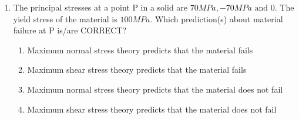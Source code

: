 \documentclass[journal]{IEEEtran}
\numberwithin{equation}{enumi}
\numberwithin{figure}{enumi}
\begin{document}
\begin{enumerate}
    \item The principal stresses at a point P in a solid are $70 MPa, -70 MPa \text{ and } 0$. The yield stress of the material is $100 MPa$. Which prediction(s) about material failure at P is/are CORRECT?

    \begin{enumerate}
        \item Maximum normal stress theory predicts that the material fails
        \item Maximum shear stress theory predicts that the material fails
        \item Maximum normal stress theory predicts that the material does not fail
        \item Maximum shear stress theory predicts that the material does not fail
    \end{enumerate}
\end{enumerate}
\end{document}
